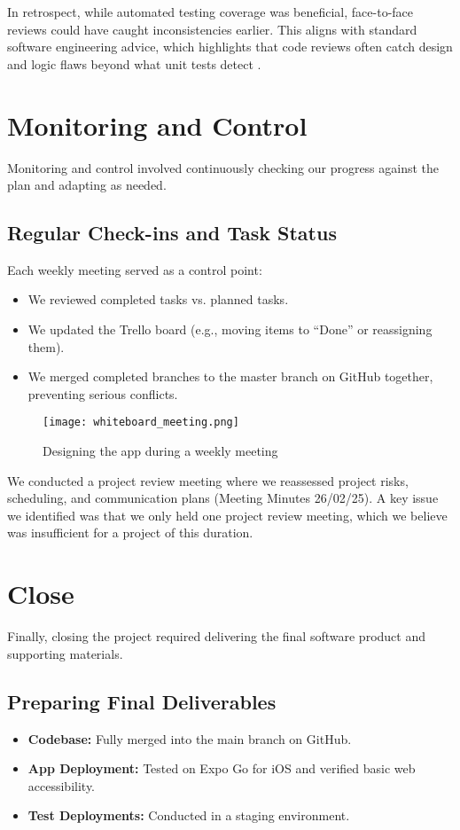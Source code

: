 In retrospect, while automated testing coverage was beneficial, face-to-face reviews could have caught inconsistencies earlier. This aligns with standard software engineering advice, which highlights that code reviews often catch design and logic flaws beyond what unit tests detect \cite{fowler2018refactoring}.

\section{Monitoring and Control}
Monitoring and control involved continuously checking our progress against the plan and adapting as needed.

\subsection{Regular Check-ins and Task Status}
Each weekly meeting served as a control point:
\begin{itemize}
    \item We reviewed completed tasks vs. planned tasks.
    \item We updated the Trello board (e.g., moving items to “Done” or reassigning them).
    \item We merged completed branches to the master branch on GitHub together, preventing serious conflicts.
\end{itemize}

\begin{figure}[H]
    \centering
    \texttt{[image: whiteboard\_meeting.png]} %
    \caption{Designing the app during a weekly meeting}
    \label{fig:whiteboard_meeting}
\end{figure}

We conducted a project review meeting where we reassessed project risks, scheduling, and communication plans (Meeting Minutes 26/02/25). A key issue we identified was that we only held one project review meeting, which we believe was insufficient for a project of this duration. 

\section{Close}
Finally, closing the project required delivering the final software product and supporting materials.

\subsection{Preparing Final Deliverables}
\begin{itemize}
    \item \textbf{Codebase:} Fully merged into the main branch on GitHub.
    \item \textbf{App Deployment:} Tested on Expo Go for iOS and verified basic web accessibility.
    \item \textbf{Test Deployments:} Conducted in a staging environment.
\end{itemize}

